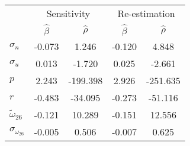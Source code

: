 \begin{tabular}{l*{4}{c}} \toprule 
& \multicolumn{2}{c}{Sensitivity} & \multicolumn{2}{c}{Re-estimation} \\ \cmidrule(lr){2-3} \cmidrule(lr){4-5}  
& $\hat{\beta}$ & $\hat{\rho}$ & $\hat{\beta}$ & $\hat{\rho}$ \\ \cmidrule(lr){2-5} 
  $\sigma_{n}$ & -0.073 & 1.246 & -0.120 & 4.848 \\ 
  $\sigma_{u}$ & 0.013 & -1.720 & 0.025 & -2.661 \\ 
  $p$ & 2.243 & -199.398 & 2.926 & -251.635 \\ 
  $r$ & -0.483 & -34.095 & -0.273 & -51.116 \\ 
  $\tilde{\omega}_{26}$ & -0.121 & 10.289 & -0.151 & 12.556 \\ 
  $\sigma_{\omega_{26}}$ & -0.005 & 0.506 & -0.007 & 0.625 \\ 
 \bottomrule 
 \end{tabular}